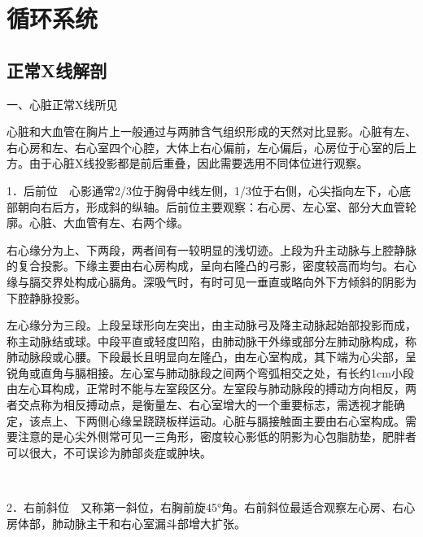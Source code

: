 \chapter{循环系统}

\section{正常X线解剖}

一、心脏正常X线所见

心脏和大血管在胸片上一般通过与两肺含气组织形成的天然对比显影。心脏有左、右心房和左、右心室四个心腔，大体上右心偏前，左心偏后，心房位于心室的后上方。由于心脏X线投影都是前后重叠，因此需要选用不同体位进行观察。

1．后前位　心影通常2/3位于胸骨中线左侧，1/3位于右侧，心尖指向左下，心底部朝向右后方，形成斜的纵轴。后前位主要观察：右心房、左心室、部分大血管轮廓。心脏、大血管有左、右两个缘。

右心缘分为上、下两段，两者间有一较明显的浅切迹。上段为升主动脉与上腔静脉的复合投影。下缘主要由右心房构成，呈向右隆凸的弓影，密度较高而均匀。右心缘与膈交界处构成心膈角。深吸气时，有时可见一垂直或略向外下方倾斜的阴影为下腔静脉投影。

左心缘分为三段。上段呈球形向左突出，由主动脉弓及降主动脉起始部投影而成，称主动脉结或球。中段平直或轻度凹陷，由肺动脉干外缘或部分左肺动脉构成，称肺动脉段或心腰。下段最长且明显向左隆凸，由左心室构成，其下端为心尖部，呈锐角或直角与膈相接。左心室与肺动脉段之间两个弯弧相交之处，有长约1cm小段由左心耳构成，正常时不能与左室段区分。左室段与肺动脉段的搏动方向相反，两者交点称为相反搏动点，是衡量左、右心室增大的一个重要标志，需透视才能确定，该点上、下两侧心缘呈跷跷板样运动。心脏与膈接触面主要由右心室构成。需要注意的是心尖外侧常可见一三角形，密度较心影低的阴影为心包脂肪垫，肥胖者可以很大，不可误诊为肺部炎症或肿块。

\begin{figure}
  \centering
{}
\\
\caption{}
\label{fig4-1-1}
\end{figure}

2．右前斜位　又称第一斜位，右胸前旋45°角。右前斜位最适合观察左心房、右心房体部，肺动脉主干和右心室漏斗部增大扩张。

